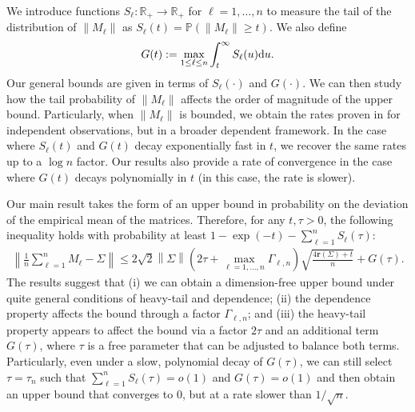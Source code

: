 \documentclass[11pt,a4paper]{article}
\theoremstyle{remark}
\theoremstyle{definition}
\theoremstyle{definition}
\newcommand{\Surv}{S}
\begin{document}
\begin{bibunit}[apalike]
We introduce functions $\Surv_\ell: \mathbb{R}_+ \to \mathbb{R}_+$ for $\ell = 1,\ldots,n$ to measure the tail of the distribution of $\|M_\ell\|$ as $\Surv_\ell(t) = \mathbb{P}(\|M_\ell\|\geq t)$. We also define 
\begin{align}
    G(t) := \max_{1\leq \ell\leq n} \int_{t}^{\infty} \Surv_\ell(u) {\rm d} u .
\end{align}
Our general bounds are given in terms of $\Surv_\ell(\cdot)$ and $G(\cdot)$. We can then study how the tail probability of $\|M_\ell\|$ affects the order of magnitude of the upper bound. 
Particularly, when $\|M_\ell\|$ is bounded, we obtain the rates proven in \citep{koltchinskii2017concentration,zhivotovskiy2021dimension} for independent observations, but in a broader dependent framework. 
In the case where $\Surv_\ell(t)$ and $G(t)$ decay exponentially fast in $t$, we recover the same rates up to a $\log n$ factor. Our results also provide a rate of convergence in the case where $G(t)$ decays polynomially in $t$ (in this case, the rate is slower).


Our main result takes the form of an upper bound in probability on the deviation of the empirical mean of the matrices.
Therefore, for any $t, \tau > 0$, the following inequality holds with probability at least $1-\exp(-t) - \sum_{\ell=1}^n \Surv_\ell(\tau)$:
\begin{align*}
    \left\|\frac{1}{n}\sum_{\ell =1}^{n} M_{\ell}-\Sigma\right\|\le2\sqrt{2}\left\|\Sigma\right\|\left(2\tau+ \max_{\ell = 1,\ldots,n}\Gamma_{\ell, n}\right)\sqrt{\frac{4\mathbf{r}\left(\Sigma\right)+t}{n}} + G(\tau).
\end{align*}
The results suggest that (i) we can obtain a dimension-free upper bound under quite general conditions of heavy-tail and dependence; (ii) the dependence property affects the bound through a factor $\Gamma_{\ell, n}$; and (iii) the heavy-tail property appears to affect the bound via a factor $2\tau$ and an additional term $G(\tau)$, where $\tau$ is a free parameter that can be adjusted to balance both terms. Particularly, even under a slow, polynomial decay of $G(\tau)$, we can still select $\tau=\tau_n$ such that $\sum_{\ell=1}^n \Surv_\ell(\tau) = o(1)$ and $G(\tau)=o(1)$ and then obtain an upper bound that converges to $0$, but at a rate slower than $1/\sqrt{n}$.




\end{bibunit}
\end{document}
